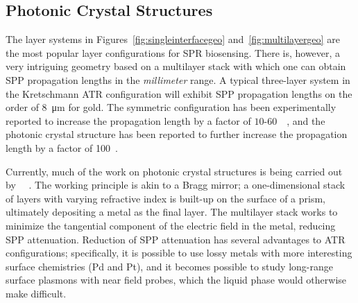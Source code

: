 \subsection{Photonic Crystal Structures}
The layer systems in Figures~\ref{fig:singleinterfacegeo}
and~\ref{fig:multilayergeo} are the most popular layer
configurations for SPR biosensing.  There is, however, a very intriguing
geometry based on a multilayer stack with which one can obtain SPP
propagation lengths in the \textit{millimeter} range.  A typical three-layer system in the Kretschmann ATR configuration will exhibit SPP
propagation lengths on the order of \SI{8}{\micro\meter} for gold.  The
symmetric configuration has been experimentally reported to increase the
propagation length by a factor of
$10$-$60$~\cite{kuwamura1983experimental}~\cite{craig1983experimental}, and
the photonic crystal structure has been reported to further increase the
propagation length by a factor of 100~\cite{konopsky2009long}.

Currently, much of the work on photonic crystal structures is being carried
out by ~\cite{konopsky2006long}~\cite{konopsky2009long}.
The working principle is akin to a Bragg mirror; a one-dimensional stack of
layers with varying refractive index is built-up on the surface of a prism,
ultimately depositing a metal as the final layer.  The multilayer stack
works to minimize the tangential component of the electric field in the
metal, reducing SPP attenuation.  Reduction of SPP attenuation has several
advantages to ATR configurations; specifically, it is possible to use lossy metals with
more interesting surface chemistries (Pd and Pt), and it becomes possible
to study long-range surface plasmons with near field probes, which the
liquid phase would otherwise make difficult.
